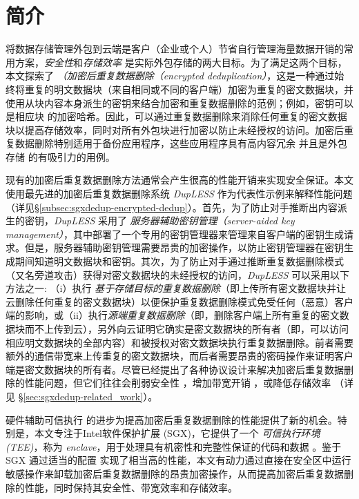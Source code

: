 \section{简介}
\label{sec:sgxdedup-introduction}

将数据存储管理外包到云端是客户（企业或个人）节省自行管理海量数据开销的常用方案，\textit{安全性}和\textit{存储效率} 是实际外包存储的两大目标。为了满足这两个目标，本文探索了 \textit{（加密后重复数据删除（encrypted deduplication）}，这是一种通过始终将重复的明文数据块（来自相同或不同的客户端）加密为重复的密文数据块，并使用从块内容本身派生的密钥来结合加密和重复数据删除的范例；例如，密钥可以是相应块 \cite{douceur02} 的加密哈希。因此，可以通过重复数据删除来消除任何重复的密文数据块以提高存储效率，同时对所有外包块进行加密以防止未经授权的访问。加密后重复数据删除特别适用于备份应用程序，这些应用程序具有高内容冗余 \cite{wallace12} 并且是外包存储 \cite{hasan05,kotla07,varble09} 的有吸引力的用例。
  
现有的加密后重复数据删除方法通常会产生很高的性能开销来实现安全保证。本文使用最先进的加密后重复数据删除系统 {\em DupLESS} \cite{bellare2013DupLESS} 作为代表性示例来解释性能问题（详见\S\ref{subsec:sgxdedup-encrypted-dedup}）。首先，为了防止对手推断出内容派生的密钥，{\em DupLESS} 采用了 \textit{服务器辅助密钥管理（server-aided key management）}，其中部署了一个专用的密钥管理器来管理来自客户端的密钥生成请求。但是，服务器辅助密钥管理需要昂贵的加密操作，以防止密钥管理器在密钥生成期间知道明文数据块和密钥。其次，为了防止对手通过推断重复数据删除模式（又名旁道攻击\cite{harnik2010side, halevi2011proofs}）获得对密文数据块的未经授权的访问，{\em DupLESS} 可以采用以下方法之一: （i）执行 \textit{基于存储目标的重复数据删除}（即上传所有密文数据块并让云删除任何重复的密文数据块）以便保护重复数据删除模式免受任何（恶意）客户端的影响，或（ii）执行\textit{源端重复数据删除}（即，删除客户端上所有重复的密文数据块而不上传到云），另外向云证明它确实是密文数据块的所有者（即，可以访问相应明文数据块的全部内容）和被授权对密文数据块执行重复数据删除。前者需要额外的通信带宽来上传重复的密文数据块，而后者需要昂贵的密码操作来证明客户端是密文数据块的所有者。尽管已经提出了各种协议设计来解决加密后重复数据删除的性能问题，但它们往往会削弱安全性 \cite{li20b,xu2013weak,pietro12}，增加带宽开销 \cite{harnik10,li15}，或降低存储效率 \cite{zhou2015secdep, qin17,li20b}（详见 \S\ref{sec:sgxdedup-related_work}）。
  
硬件辅助可信执行 \cite{trustzone,sgx,Mktem,AMDSEV} 的进步为提高加密后重复数据删除的性能提供了新的机会。特别是，本文专注于Intel软件保护扩展 (SGX)，它提供了一个 \textit{ 可信执行环境 (TEE)}，称为 \textit{ enclave}，用于处理具有机密性和完整性保证的代码和数据 \cite{baumann2014Shielding }。鉴于 SGX 通过适当的配置 \cite{harnik18} 实现了相当高的性能，本文有动力通过直接在安全区中运行敏感操作来卸载加密后重复数据删除的昂贵加密操作，从而提高加密后重复数据删除的性能，同时保持其安全性、带宽效率和存储效率。

